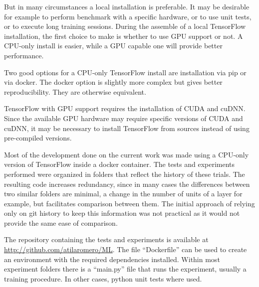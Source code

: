 But in many circumstances a local installation is preferable. It may be desirable for example to perform benchmark with a specific hardware, or to use unit tests, or to execute long training sessions. 
During the assemble of a local TensorFlow installation, the first choice to make is whether to use GPU support or not. A CPU-only install is easier, while a GPU capable one will provide better performance.

Two good options for a CPU-only TensorFlow install are installation via pip or via docker. The docker option is slightly more complex but gives better reproducibility. They are otherwise equivalent.

TensorFlow with GPU support requires the installation of CUDA and cuDNN. Since the available GPU hardware may require specific versions of CUDA and cuDNN, it may be necessary to install TensorFlow from sources instead of using pre-compiled versions.

Most of the development done on the current work was made using a CPU-only version of TensorFlow inside a docker container. The tests and experiments performed were organized in folders that reflect the history of these trials. The resulting code increases redundancy, since in many cases the differences between two similar folders are minimal, a change in the number of units of a layer for example, but facilitates comparison between them. The initial approach of relying only on git history to keep this information was not practical as it would not provide the same ease of comparison.

The repository containing the tests and experiments is available at \url{http://github.com/atilaromero/ML}. The file ``Dockerfile'' can be used to create an environment with the required dependencies installed. Within most experiment folders there is a ``main.py'' file that runs the experiment, usually a training procedure. In other cases, python unit tests where used.
